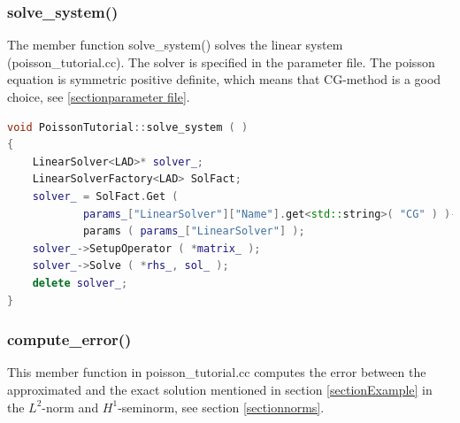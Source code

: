 \documentclass[a4paper, 11pt, twoside]{article}
\begin{document}
\subsubsection{solve\_system()}
The member function solve\_system() solves  the linear system (poisson\_tutorial.cc). The solver is specified in the parameter file. The poisson equation is symmetric positive definite, which means that CG-method is a good choice, see \ref{sectionparameter file}.

\begin{lstlisting}[language=C++, basicstyle={\footnotesize, \ttfamily}, keywordstyle=\color{blue}, numbers=none, tabsize=4]
void PoissonTutorial::solve_system ( )
{
    LinearSolver<LAD>* solver_;
    LinearSolverFactory<LAD> SolFact;
    solver_ = SolFact.Get (
            params_["LinearSolver"]["Name"].get<std::string>( "CG" ) )->
            params ( params_["LinearSolver"] );
    solver_->SetupOperator ( *matrix_ );
    solver_->Solve ( *rhs_, sol_ );
    delete solver_;
}
\end{lstlisting}

\subsubsection{compute\_error()}\label{memberComputeError}
This member function in poisson\_tutorial.cc computes the error between the approximated and the exact solution mentioned in section \ref{sectionExample} in the $L^2$-norm and $H^1$-seminorm, see section \ref{sectionnorms}.
\end{document}
